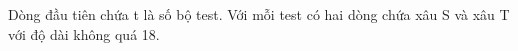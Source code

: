 Dòng đầu tiên chứa t là số bộ test. Với mỗi test có hai dòng chứa xâu S và xâu T với độ dài không quá 18.  

\